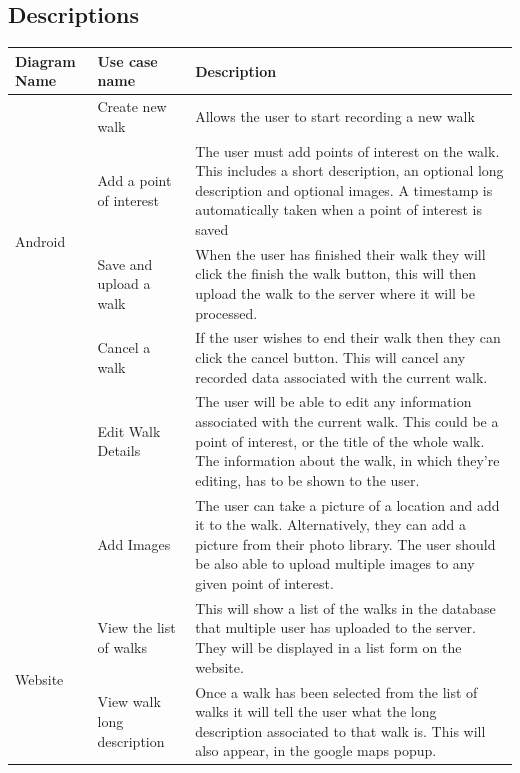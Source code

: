 \documentclass[12pt]{article}
\begin{document}
\subsection{Descriptions}
\clearpage
\setlength\LTleft{-1cm}
\begin{longtable}{|p{2cm}|p{3cm}|p{10cm}|}
\hline
	Diagram Name & Use case name  & Description \\
\hline

 \multirow{4}{*}{Android} & \multicolumn{1}{|p{3cm}|}{Create new walk} & \multicolumn{1}{|p{10cm}|}{Allows the user to start recording a new walk} \\\cline{2-3} & \multicolumn{1}{|p{3cm}|}{Add a point of interest
} & \multicolumn{1}{|p{10cm}|}{The user must add points of interest on the walk. This includes a short description, an optional long description and optional images. A timestamp is automatically taken when a point of interest is saved}
\\\cline{2-3} & \multicolumn{1}{|p{3cm}|}{Save and upload a walk} & \multicolumn{1}{|p{10cm}|}{When the user has finished their walk they will click the finish the walk button, this will then upload the walk to the server where it will be processed.}
\\\cline{2-3} & \multicolumn{1}{|p{3cm}|}{Cancel a walk} & \multicolumn{1}{|p{10cm}|}{If the user wishes to end their walk then they can click the cancel button. This will cancel any recorded data associated with the current walk.}
\\\cline{2-3} & \multicolumn{1}{|p{3cm}|}{Edit Walk Details} & \multicolumn{1}{|p{10cm}|}{The user will be able to edit any information associated with the current walk. This could be a point of interest, or the title of the whole walk. The information about the walk, in which they're editing, has to be shown to the user.}
\\\cline{2-3} & \multicolumn{1}{|p{3cm}|}{Add Images} & \multicolumn{1}{|p{10cm}|}{The user can take a picture of a location and add it to the walk. Alternatively, they can add a picture from their photo library. The user should be also able to upload multiple images to any given point of interest.}
\\\hline
 \multirow{4}{*}{Website} & \multicolumn{1}{|p{3cm}|}{View the list of walks} & \multicolumn{1}{|p{10cm}|}{This will show a list of the walks in the database that multiple user has uploaded to the server. They will be displayed in a list form on the website.} \\\cline{2-3} & \multicolumn{1}{|p{3cm}|}{View walk long description}& \multicolumn{1}{|p{10cm}|}{Once a walk has been selected from the list of walks it will tell the user what the long description associated to that walk is. This will also appear, in the google maps popup.}

\end{longtable}
\end{document}
